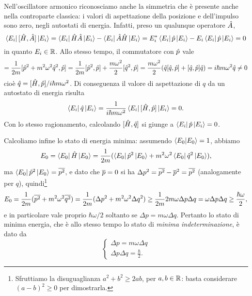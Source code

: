 Nell'oscillatore armonico riconosciamo anche la simmetria che è presente anche nella controparte classica: i valori di aspettazione della posizione e dell'impulso sono zero, negli autostati di energia.
Infatti, preso un qualunque operatore $\hat{A}$,
\begin{equation}
	\left\langle{E_i}\right|[\hat{H},\hat{A}]\left|{E_i}\right\rangle=\left\langle{E_i}\right|\hat{H}\hat{A}\left|{E_i}\right\rangle-\left\langle{E_i}\right|\hat{A}\hat{H}\left|{E_i}\right\rangle=E_i^*\left\langle{E_i}\right|\hat{p}\left|{E_i}\right\rangle-E_i\left\langle{E_i}\right|\hat{p}\left|{E_i}\right\rangle=0
\end{equation}
in quanto $E_i\in\mathbb{R}$.
Allo stesso tempo, il commutatore con $\hat{p}$ vale
\begin{equation}
	[\op H,\op p]=\frac1{2m}[\op p^2+m^2\omega^2\op q^2,\op p]=\frac1{2m}[\op p^2,\op p]+\frac{m\omega^2}{2}[\op q^2,\op p]=\frac{m\omega^2}2(\op q[\op q,\op p]+[\op q,\op p]\op q)=i\hbar m\omega^2\op q\ne 0
	\label{eq:commutatore-Hp}
\end{equation}
cioè $\hat{q}=[\hat{H},\hat{p}]/i\hbar m\omega^2$.
Di conseguenza il valore di aspettazione di $q$ da un autostato di energia risulta
\begin{equation}
	\left\langle{E_i}\right|\hat{q}\left|{E_i}\right\rangle=\frac1{i\hbar m\omega^2}\left\langle{E_i}\right|[\hat{H},\hat{p}]\left|{E_i}\right\rangle=0.
\end{equation}
Con lo stesso ragionamento, calcolando $[\hat{H},\hat{q}]$ si giunge a $\left\langle{E_i}\right|\hat{p}\left|{E_i}\right\rangle=0$.

Calcoliamo infine lo stato di energia minima: assumendo $\left\langle{E_0}\middle|{E_0}\right\rangle=1$, abbiamo
\begin{equation}
	E_0=\left\langle{E_0}\right|\hat{H}\left|{E_0}\right\rangle=\frac1{2m}(\left\langle{E_0}\right|\hat{p}^2\left|{E_0}\right\rangle+m^2\omega^2\left\langle{E_0}\right|\hat{q}^2\left|{E_0}\right\rangle),
\end{equation}
ma $\left\langle{E_0}\right|\hat{p}^2\left|{E_0}\right\rangle=\overline{p^2}$, e dato che $\overline{p}=0$ si ha $\Delta p^2=\overline{p^2}-\overline{p}^2=\overline{p^2}$ (analogamente per $q$), quindi\footnote{Sfruttiamo la disuguaglianza $a^2+b^2\ge 2ab$, per $a,b\in\mathbb{R}$: basta considerare $(a-b)^2\ge 0$ per dimostrarla.}
\begin{equation}
	E_0=\frac1{2m}(\overline{p^2}+m^2\omega^2\overline{q^2})=\frac1{2m}(\Delta p^2+m^2\omega^2\Delta q^2)\ge \frac1{2m}2m\omega\Delta p\Delta q=\omega\Delta p\Delta q\ge\frac{\hbar\omega}2,
\end{equation}
e in particolare vale proprio $\hbar\omega/2$ soltanto se $\Delta p=m\omega\Delta q$.
Pertanto lo stato di minima energia, che è allo stesso tempo lo stato di \emph{minima indeterminazione}, è dato da
\begin{equation}
	\begin{cases}
		\Delta p=m\omega\Delta q\\ \Delta p\Delta q=\frac{\hbar}2.
	\end{cases}
	\label{eq:oscillatore-armonico-stato-minima-energia}
\end{equation}

